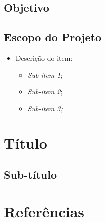 \documentclass[12pt]{article}
\begin{document}
	\subsection{Objetivo}
	
	\lipsum[2]
	
	\subsection{Escopo do Projeto}
	
	\begin{itemize}
		\item Descrição do item:
		\begin{itemize}
			\item {\it Sub-item 1};
			\item {\it Sub-item 2};
			\item {\it Sub-item 3;}
		\end{itemize}
	\end{itemize}
	
	\section{Título}
	\subsection{Sub-título}

	\lipsum[2]

	\section{Referências}
	


	
\end{document}
